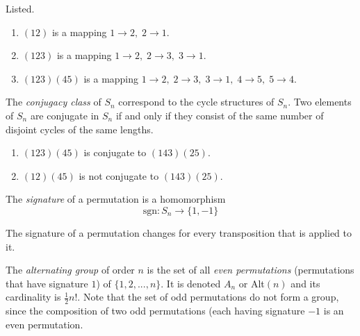 \documentclass{article}
\begin{document}
      \begin{example}
        Listed.
        \begin{enumerate}
          \item $(1 2)$ is a mapping $1 \rightarrow 2,\; 2 \rightarrow 1$. 
          \item $(1 2 3)$ is a mapping $1\rightarrow 2,\; 2 \rightarrow 3,\; 3 \rightarrow 1$. 
          \item $(1 2 3) (4 5)$ is a mapping $1\rightarrow 2,\; 2 \rightarrow 3,\; 3 \rightarrow 1, \;4 \rightarrow 5, \;5 \rightarrow 4$. 
        \end{enumerate}
      \end{example}

      \begin{definition}
        The \textit{conjugacy class} of $S_{n}$ correspond to the cycle structures of $S_{n}$. Two elements of $S_{n}$ are conjugate in $S_{n}$ if and only if they consist of the same number of disjoint cycles of the same lengths. 
      \end{definition}

      \begin{example}
        \begin{enumerate}
          \item $(1 2 3) (4 5)$ is conjugate to $(1 4 3) (2 5)$.
          \item $(1 2) (4 5)$ is not conjugate to $(1 4 3) (2 5)$. 
        \end{enumerate}
      \end{example}

      \begin{definition}
        The \textit{signature} of a permutation is a homomorphism
        \begin{equation}
          \text{sgn}: S_{n} \longrightarrow \{1, -1\}
        \end{equation}
      \end{definition}

      \begin{proposition}
        The signature of a permutation changes for every transposition that is applied to it. 
      \end{proposition}

      \begin{definition}
        The \textit{alternating group} of order $n$ is the set of all \textit{even permutations} (permutations that have signature $1$) of $\{1, 2, ..., n\}$. It is denoted $A_{n}$ or Alt$(n)$ and its cardinality is $\frac{1}{2} n!$. Note that the set of odd permutations do not form a group, since the composition of two odd permutations (each having signature $-1$ is an even permutation. 
      \end{definition}
\end{document}
